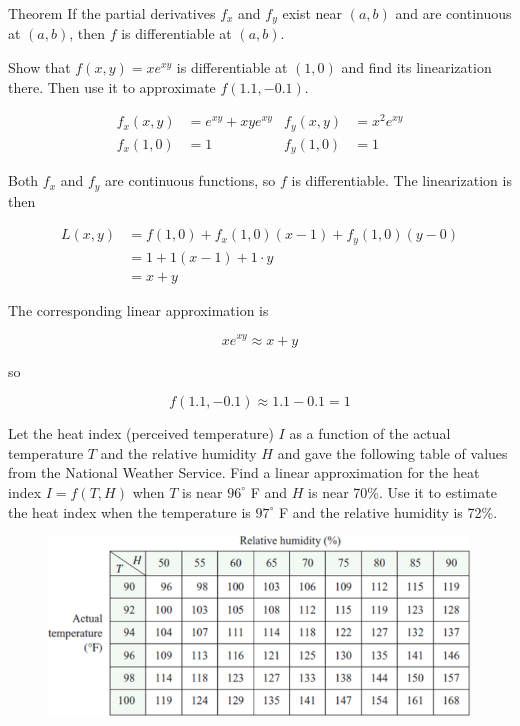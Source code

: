         \begin{theorem}{Theorem}
            If the partial derivatives $f_x$ and $f_y$ exist near $(a,b)$ and are continuous at $(a,b)$, then $f$ is differentiable at $(a,b)$.
        \end{theorem}

        \textit{} Show that $f(x,y) = xe^{xy}$ is differentiable at $(1,0)$ and find its linearization there. Then use it to approximate $f(1.1, -0.1)$.

        \begin{align*}
            f_x(x,y)    &= e^{xy} + xye^{xy}    & f_y (x,y) &= x^2 e^{xy} \\
            f_x(1,0)    &= 1                    & f_y (1,0) &= 1
        \end{align*}

        Both $f_x$ and $f_y$ are continuous functions, so $f$ is differentiable. The linearization is then

        \begin{align*}
            L(x,y)  &= f(1,0) + f_x (1,0)(x-1) + f_y (1,0)(y-0) \\
                    &= 1 + 1(x-1) + 1\cdot y \\
                    &= x + y
        \end{align*}

        The corresponding linear approximation is

        \[
            xe^{xy} \approx x + y
        \]

        so

        \[
            f(1.1, -0.1) \approx 1.1 - 0.1 = 1
        \]

        \textit{} Let the heat index (perceived temperature) $I$ as a function of the actual temperature $T$ and the relative humidity $H$ and gave the following table of values from the National Weather
        Service. Find a linear approximation for the heat index $I = f(T,H)$ when $T$ is near $96^{\circ}$ F and $H$ is near 70\%. Use it to estimate the heat index when the temperature is $97^{\circ}$ F and the relative
        humidity is 72\%. 

        \begin{figure}[hbt!]
            \centering
            \includegraphics[scale = 0.75]{Resources/14.4_Heat_Index}
        \end{figure}


